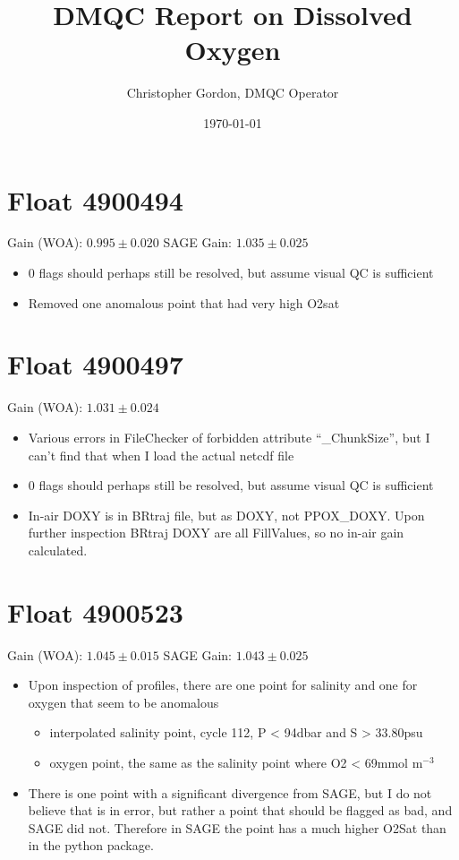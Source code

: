 

\title{DMQC Report on Dissolved Oxygen}
\author{Christopher Gordon, DMQC Operator}
\date{\today}


\maketitle
\clearpage
\section{Float 4900494}

Gain (WOA): $0.995 \pm 0.020$
SAGE Gain: $1.035 \pm 0.025$

\begin{itemize}
	\item 0 flags should perhaps still be resolved, but assume visual QC is sufficient
	\item Removed one anomalous point that had very high O2sat
\end{itemize}
\section{Float 4900497}

Gain (WOA): $1.031 \pm 0.024$

\begin{itemize}
	\item Various errors in FileChecker of forbidden attribute ``\_ChunkSize'', but I can't find that when I load the actual netcdf file
	\item 0 flags should perhaps still be resolved, but assume visual QC is sufficient
	\item In-air DOXY is in BRtraj file, but as DOXY, not PPOX\_DOXY. Upon further inspection BRtraj DOXY are all FillValues, so no in-air gain calculated.
\end{itemize}
\section{Float 4900523}

Gain (WOA): $1.045 \pm 0.015$
SAGE Gain: $1.043 \pm 0.025$

\begin{itemize}
	\item Upon inspection of profiles, there are one point for salinity and one for oxygen that seem to be anomalous
	\begin{itemize}
		\item interpolated salinity point, cycle 112, P < 94dbar and S > 33.80psu
		\item oxygen point, the same as the salinity point where O2 < 69mmol m$^{-3}$
	\end{itemize}
	\item There is one point with a significant divergence from SAGE, but I do not believe that is in error, but rather a point that should be flagged as bad, and SAGE did not. Therefore in SAGE the point has a much higher O2Sat than in the python package.
\end{itemize}
